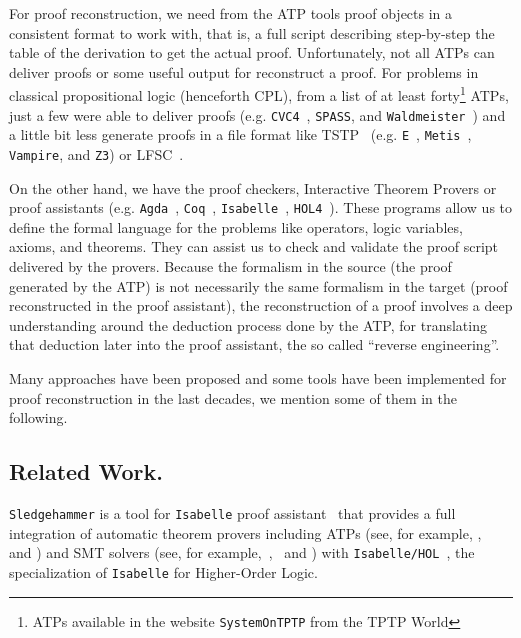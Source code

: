 \documentclass[runningheads,a4paper]{llncs}
\begin{document}
For proof reconstruction, we need from the ATP tools proof objects in a consistent format to work with, that is, a full script describing
step-by-step the table of the derivation to get the actual proof. Unfortunately,
not all ATPs can deliver proofs or some useful output for reconstruct a proof.
For problems in classical propositional logic (henceforth CPL), from a list of
at least forty\footnote{ATPs available in the website  \texttt{SystemOnTPTP} from the TPTP World} ATPs, just a few were able to deliver proofs (e.g.
\verb!CVC4!~\cite{Barrett2011}, \verb!SPASS!, and
\verb!Waldmeister!~\cite{hillenbrand1997}) and a little bit less generate proofs in a file
format like TSTP~\cite{sutcliffe2004tstp} (e.g. \verb!E!~\cite{Schulz:AICOM-2002}, \verb!Metis!~\cite{hurd2003first}, \verb!Vampire!, and \verb!Z3!) or LFSC~\cite{Stump2008}.

On the other hand, we have the proof checkers, Interactive Theorem Provers
or proof assistants (e.g. \verb!Agda!~\cite{agdateam}, \verb!Coq!~\cite{coqteam}, \verb!Isabelle!~\cite{paulson1994isabelle}, \verb!HOL4!~\cite{norrish2007hol}). These programs allow us to define the formal language for the problems like operators, logic variables, axioms, and theorems. They can assist us to check and validate the proof script delivered by the provers. Because the formalism in the source (the proof generated by the ATP) is not necessarily the same formalism in the target (proof reconstructed in the proof assistant), the reconstruction of a proof involves a deep understanding around the deduction process done by the ATP, for translating that deduction later into the proof assistant, the so called ``reverse engineering''.

Many approaches have been proposed and some tools have been implemented for proof reconstruction in the last decades, we mention some of them in the following.

\subsection*{Related Work.}\label{Related Work}
\par
\verb!Sledgehammer! is a tool for \verb!Isabelle! proof
assistant~\cite{paulson1994isabelle} that provides a full integration of
automatic theorem provers including ATPs (see, for example,
\cite{meng2006automation}, ~\cite{blanchette2013extending} and \cite{Fleury2014}) and SMT solvers (see, for
example,~\cite{blanchette2013extending},~\cite{bohme2010} and \cite{Fleury2014}) with \verb!Isabelle/HOL!~\cite{nipkow2002isabelle}, the specialization of \verb!Isabelle! for Higher-Order Logic.
\end{document}
